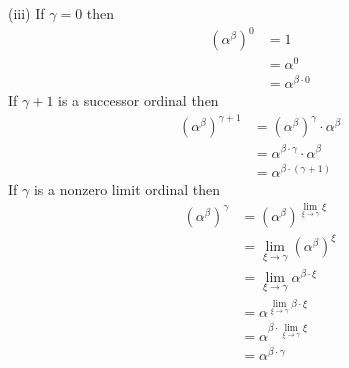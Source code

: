 \begin{solution}
(iii) If $\gamma = 0$ then
\begin{align*}
\left( \alpha^{\beta} \right)^0 &= 1 \\
&= \alpha^0 \\
&= \alpha^{\beta \cdot 0}
\end{align*}
If $\gamma + 1$ is a successor ordinal then
\begin{align*}
\left( \alpha^{\beta} \right)^{\gamma + 1} &= \left( \alpha^{\beta} 
  \right)^{\gamma} \cdot \alpha^{\beta} \\
&= \alpha^{\beta \cdot \gamma} \cdot \alpha^{\beta} \\
&= \alpha^{\beta \cdot \left( \gamma + 1 \right)}
\end{align*}
If $\gamma$ is a nonzero limit ordinal then
\begin{align*}
\left( \alpha^{\beta} \right)^{\gamma} &= \left( \alpha^{\beta} 
  \right)^{\lim_{\xi \rightarrow \gamma} \xi} \\
&= \lim_{\xi \rightarrow \gamma} \left( \alpha^{\beta} \right)^{\xi} \\
&= \lim_{\xi \rightarrow \gamma} \alpha^{\beta \cdot \xi} \\
&= \alpha^{\lim_{\xi \rightarrow \gamma} \beta \cdot \xi} \\
&= \alpha^{\beta \cdot \lim_{\xi \rightarrow \gamma} \xi} \\
&= \alpha^{\beta \cdot \gamma}
\end{align*}
\end{solution}